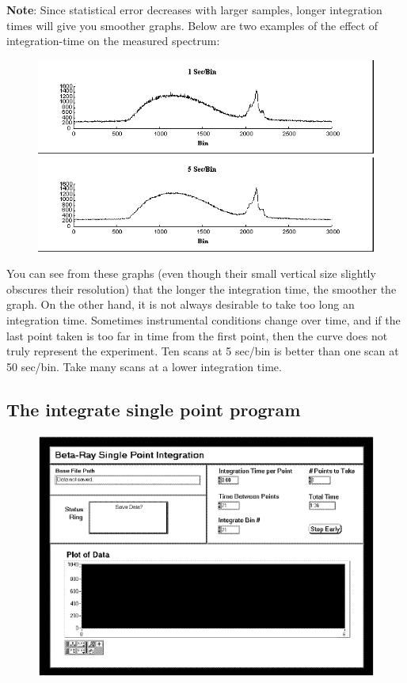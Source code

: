 \documentclass{../lab}
\begin{document}
\textbf{Note}: Since statistical error decreases with larger samples, longer integration times will give you smoother graphs. Below are two examples of the effect of integration-time on the measured spectrum:

\begin{figure}[h]
    \centering
    \href{http://experimentationlab.berkeley.edu/sites/default/files/images/BRAimage035.gif}{\includegraphics[width=0.7\linewidth]{images/BRAimage035.png}} \\
    \href{http://experimentationlab.berkeley.edu/sites/default/files/images/BRAimage036.gif}{\includegraphics[width=0.7\linewidth]{images/BRAimage036.png}}
    \caption{}
\end{figure}

You can see from these graphs (even though their small vertical size slightly obscures their resolution) that the longer the integration time, the smoother the graph. On the other hand, it is not always desirable to take too long an integration time. Sometimes instrumental conditions change over time, and if the last point taken is too far in time from the first point, then the curve does not truly represent the experiment. Ten scans at 5 sec/bin is better than one scan at 50 sec/bin. Take many scans at a lower integration time.

\subsection{The integrate single point program}
\label{subsec:IntegrateSinglePointProgram}

\begin{figure}
\centering
    \href{http://experimentationlab.berkeley.edu/sites/default/files/images/BRAimage037.gif}{\includegraphics[width=0.7\linewidth]{images/BRAimage037.png}}
    \caption{}
\end{figure}
\end{document}
